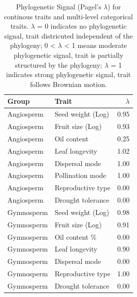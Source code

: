 \documentclass{article}
\begin{document}
\begin{table}[ht]
\centering

\begin{tabular}{llr}
  \hline
Group & Trait & $\lambda$ \\ 
  \hline
Angiosperm & Seed weight (Log) & 0.95 \\ 
  Angiosperm & Fruit size (Log) & 0.93 \\ 
  Angiosperm & Oil content & 0.25 \\ 
  Angiosperm & Leaf longevity & 1.02 \\ 
  Angiosperm & Dispersal mode & 1.00 \\ 
  Angiosperm & Pollination mode & 1.00 \\ 
  Angiosperm & Reproductive type & 0.00 \\ 
  Angiosperm & Drought tolerance & 0.00 \\ 
  Gymnosperm & Seed weight (Log) & 0.98 \\ 
  Gymnosperm & Fruit size (Log) & 0.91 \\ 
  Gymnosperm & Oil content \% & 0.00 \\ 
  Gymnosperm & Leaf longevity & 0.90 \\ 
  Gymnosperm & Dispersal mode & 0.00 \\ 
  Gymnosperm & Reproductive type & 1.00 \\ 
  Gymnosperm & Drought tolerance & 0.00 \\ 
   \hline
\end{tabular}
\caption{Phylogenetic Signal (Pagel's $\lambda$) for continous traits and multi-level categorical traits. $\lambda$ = 0 indicates no phylogenetic signal, trait districuted independent of the phylogeny; 0 < $\lambda$ < 1 means moderate phylogenetic signal, trait is partially structured by the phylogeny; $\lambda$ = 1 indicates strong phylogenetic signal, trait follows Brownian motion.}
\label{tab:lambda}
\end{table}
\end{document}
